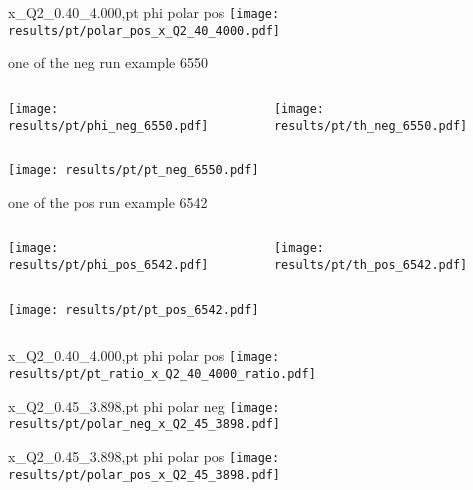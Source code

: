\begin{frame}{x\_Q2\_0.40\_4.000,pt phi polar pos}
\texttt{[image: results/pt/polar\_pos\_x\_Q2\_40\_4000.pdf]}
\end{frame}
\begin{frame}{one of the neg run example 6550}
\begin{columns}
\begin{column}[T]{0.5\textwidth}
\texttt{[image: results/pt/phi\_neg\_6550.pdf]}
\end{column}
\begin{column}[T]{0.5\textwidth}
\texttt{[image: results/pt/th\_neg\_6550.pdf]}
\end{column}
\end{columns}
\texttt{[image: results/pt/pt\_neg\_6550.pdf]}
\end{frame}
\begin{frame}{one of the pos run example 6542}
\begin{columns}
\begin{column}[T]{0.5\textwidth}
\texttt{[image: results/pt/phi\_pos\_6542.pdf]}
\end{column}
\begin{column}[T]{0.5\textwidth}
\texttt{[image: results/pt/th\_pos\_6542.pdf]}
\end{column}
\end{columns}
\begin{columns}
\begin{column}[T]{0.5\textwidth}
\texttt{[image: results/pt/pt\_pos\_6542.pdf]}
\end{column}
\begin{column}[T]{0.5\textwidth}
\end{column}
\end{columns}
\end{frame}
\begin{frame}{x\_Q2\_0.40\_4.000,pt phi polar pos}
\texttt{[image: results/pt/pt\_ratio\_x\_Q2\_40\_4000\_ratio.pdf]}
\end{frame}
\begin{frame}{x\_Q2\_0.45\_3.898,pt phi polar neg}
\texttt{[image: results/pt/polar\_neg\_x\_Q2\_45\_3898.pdf]}
\end{frame}
\begin{frame}{x\_Q2\_0.45\_3.898,pt phi polar pos}
\texttt{[image: results/pt/polar\_pos\_x\_Q2\_45\_3898.pdf]}
\end{frame}
